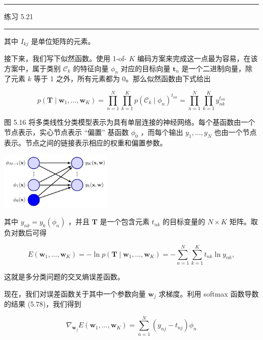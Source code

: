 \documentclass[10pt]{article}
\newcommand{\HRule}{\begin{center}\rule{0.9\linewidth}{0.2mm}\end{center}}
\begin{document}
\HRule

练习 5.21

\HRule

其中 \({I}_{kj}\) 是单位矩阵的元素。

接下来，我们写下似然函数。使用 1-of- \(K\) 编码方案来完成这一点最为容易，在该方案中，属于类别 \({\mathcal{C}}_{k}\) 的特征向量 \({\phi }_{n}\) 对应的目标向量 \({\mathbf{t}}_{n}\) 是一个二进制向量，除了元素 \(k\) 等于 1 之外，所有元素都为 0。那么似然函数由下式给出

\[
p\left( {\mathbf{T} \mid  {\mathbf{w}}_{1},\ldots ,{\mathbf{w}}_{K}}\right)  = \mathop{\prod }\limits_{{n = 1}}^{N}\mathop{\prod }\limits_{{k = 1}}^{K}p{\left( {\mathcal{C}}_{k} \mid  {\phi }_{n}\right) }^{{t}_{nk}} = \mathop{\prod }\limits_{{n = 1}}^{N}\mathop{\prod }\limits_{{k = 1}}^{K}{y}_{nk}^{{t}_{nk}} \tag{5.79}
\]

图 5.16 将多类线性分类模型表示为具有单层连接的神经网络。每个基函数由一个节点表示，实心节点表示 “偏置” 基函数 \({\phi }_{0}\) ，而每个输出 \({y}_{1},\ldots ,{y}_{N}\) 也由一个节点表示。节点之间的链接表示相应的权重和偏置参数。

\begin{center}
\includegraphics[max width=0.4\textwidth]{images/0194e279-9b28-703a-88f4-c3ac21e2010d_181_975_344_567_294_0.jpg}
\end{center}
\hspace*{3em} 

其中 \({y}_{nk} = {y}_{k}\left( {\phi }_{n}\right)\) ，并且 \(\mathbf{T}\) 是一个包含元素 \({t}_{nk}\) 的目标变量的 \(N \times  K\) 矩阵。取负对数后可得

\[
E\left( {{\mathbf{w}}_{1},\ldots ,{\mathbf{w}}_{K}}\right)  =  - \ln p\left( {\mathbf{T} \mid  {\mathbf{w}}_{1},\ldots ,{\mathbf{w}}_{K}}\right)  =  - \mathop{\sum }\limits_{{n = 1}}^{N}\mathop{\sum }\limits_{{k = 1}}^{K}{t}_{nk}\ln {y}_{nk}, \tag{5.80}
\]

这就是多分类问题的交叉熵误差函数。

现在，我们对误差函数关于其中一个参数向量 \({\mathbf{w}}_{j}\) 求梯度。利用 softmax 函数导数的结果 (5.78)，我们得到

\[
{\nabla }_{{\mathbf{w}}_{j}}E\left( {{\mathbf{w}}_{1},\ldots ,{\mathbf{w}}_{K}}\right)  = \mathop{\sum }\limits_{{n = 1}}^{N}\left( {{y}_{nj} - {t}_{nj}}\right) {\phi }_{n} \tag{5.81}
\]
\end{document}
